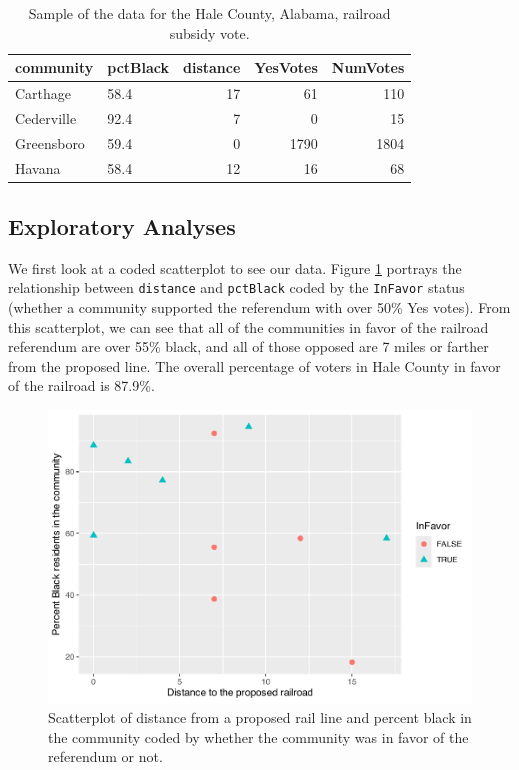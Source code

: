 \documentclass[
]{krantz}
\begin{document}
\begin{table}

\caption{\label{tab:table2chp6}Sample of the data for the Hale County, Alabama, railroad subsidy vote.}
\centering
\begin{tabular}[t]{llrrr}
\toprule
community & pctBlack & distance & YesVotes & NumVotes\\
\midrule
Carthage & 58.4 & 17 & 61 & 110\\
Cederville & 92.4 & 7 & 0 & 15\\
Greensboro & 59.4 & 0 & 1790 & 1804\\
Havana & 58.4 & 12 & 16 & 68\\
\bottomrule
\end{tabular}
\end{table}

\hypertarget{exploratory-analyses}{%
\subsection{Exploratory Analyses}\label{exploratory-analyses}}

We first look at a coded scatterplot to see our data. Figure \ref{fig:coded} portrays the relationship between \texttt{distance} and \texttt{pctBlack} coded by the \texttt{InFavor} status (whether a community supported the referendum with over 50\% Yes votes). From this scatterplot, we can see that all of the communities in favor of the railroad referendum are over 55\% black, and all of those opposed are 7 miles or farther from the proposed line. The overall percentage of voters in Hale County in favor of the railroad is 87.9\%.

\begin{figure}

{\centering \includegraphics[width=0.6\linewidth]{bookdown-BeyondMLR_files/figure-latex/coded-1} 

}

\caption{ Scatterplot of distance from a proposed rail line and percent black in the community coded by whether the community was in favor of the referendum or not.}\label{fig:coded}
\end{figure}
\end{document}
